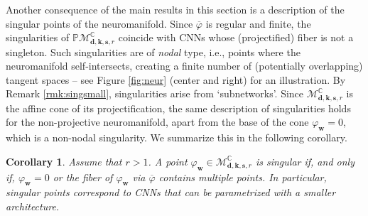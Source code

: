 \documentclass[twoside]{article}
\theoremstyle{plain}%
\newtheorem{cor}[thm]{Corollary}
\theoremstyle{definition}
\theoremstyle{remark}
\begin{document}
Another consequence of the main results in this section is a description of the singular points of the neuromanifold. Since $\overline{\varphi}$ is regular and finite, the singularities of $\mathbb{P}\mathcal{M}_{\mathbf{d}, \mathbf{k}, \mathbf{s}, r}^\mathbb{C}$ coincide with CNNs whose (projectified) fiber is not a singleton. Such singularities are of \emph{nodal} type, i.e., points where the neuromanifold self-intersects, creating a finite number of (potentially overlapping) tangent spaces -- see Figure \ref{fig:neur} (center and right) for an illustration. By Remark \ref{rmk:singsmall}, singularities arise from `subnetworks'. Since  $\mathcal{M}_{\mathbf{d}, \mathbf{k}, \mathbf{s}, r}^\mathbb{C}$ is the affine cone of its projectification, the same description of singularities holds for the non-projective neuromanifold, apart from the base of the cone $\varphi_\mathbf{w} = 0$, which is a non-nodal singularity. We summarize this in the following corollary. 
\begin{cor}\label{cor:singpts}
Assume that $r>1$. A point $\varphi_\mathbf{w} \in \mathcal{M}_{\mathbf{d}, \mathbf{k}, \mathbf{s}, r}^\mathbb{C}$ is singular if, and only if, $\varphi_\mathbf{w} = 0$ or the fiber of $\varphi_\mathbf{w}$ via $\overline{\varphi}$ contains multiple points. 
In particular, singular points correspond to CNNs that can be parametrized with a smaller architecture.
\end{cor}






\end{document}
